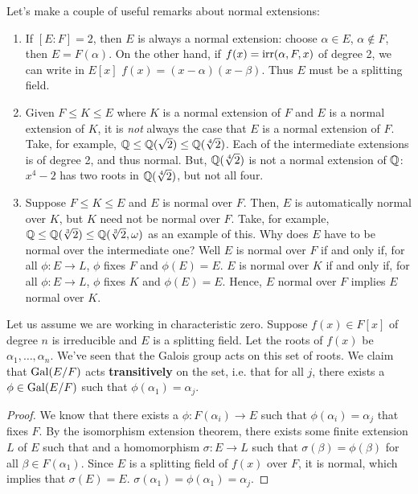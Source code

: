 \documentclass{../mathnotes}
\begin{document}
Let's make a couple of useful remarks about normal extensions:
\begin{enumerate}
    \item If $[E:F]=2$, then $E$ is always a normal extension: choose $\alpha\in E$, $\alpha\notin F$, then $E=F(\alpha)$.
        On the other hand, if $f(x)=\operatorname{irr}(\alpha,F,x)$ of degree 2, we can write in $E[x]$ $f(x)=(x-\alpha)(x-\beta)$.
        Thus $E$ must be a splitting field.
    \item Given $F\leq K\leq E$ where $K$ is a normal extension of $F$ and $E$ is a normal extension of $K$,
        it is \textit{not} always the case that $E$ is a normal extension of $F$. Take, for example,
        $\mathbb{Q}\leq\mathbb{Q}(\sqrt{2})\leq\mathbb{Q}(\sqrt[4]{2})$. Each of the intermediate extensions is of degree 2, and thus normal.
        But, $\mathbb{Q}(\sqrt[4]{2})$ is not a normal extension of $\mathbb{Q}$: $x^4-2$ has two roots in $\mathbb{Q}(\sqrt[4]{2})$, but not all four.
    \item Suppose $F\leq K\leq E$ and $E$ is normal over $F$. Then, $E$ is automatically normal over $K$, but $K$ need not be
        normal over $F$. Take, for example, $\mathbb{Q}\leq\mathbb{Q}(\sqrt[3]{2})\leq\mathbb{Q}(\sqrt[3]{2},\omega)$ as an example of this.
        Why does $E$ have to be normal over the intermediate one? Well $E$ is normal over $F$ if and only if, for all $\phi:E\to L$,
        $\phi$ fixes $F$ and $\phi(E)=E$. $E$ is normal over $K$ if and only if, for all $\phi:E \to L$, $\phi$ fixes $K$ and
        $\phi(E)=E$. Hence, $E$ normal over $F$ implies $E$ normal over $K$.
\end{enumerate}

\begin{rem}
    Let us assume we are working in characteristic zero.
    Suppose $f(x)\in F[x]$ of degree $n$ is irreducible and $E$ is a splitting field. Let the roots of $f(x)$ be $\alpha_1,\ldots,\alpha_n$.
    We've seen that the Galois group acts on this set of roots. We claim that $\operatorname{Gal}(E/F)$ acts \textbf{transitively} on the set, i.e. that for
    all $j$, there exists a $\phi\in\operatorname{Gal}(E/F)$ such that $\phi(\alpha_1)=\alpha_j$.
\end{rem}
\begin{proof}
    We know that there exists a $\phi:F(\alpha_i)\to E$ such that $\phi(\alpha_i)=\alpha_j$ that fixes $F$.
    By the isomorphism extension theorem, there exists some finite extension $L$ of $E$ such that and a homomorphism
    $\sigma:E\to L$ such that $\sigma(\beta)=\phi(\beta)$ for all $\beta\in F(\alpha_1)$. Since $E$ is a splitting field
    of $f(x)$ over $F$, it is normal, which implies that $\sigma(E)=E$. $\sigma(\alpha_1)=\phi(\alpha_1)=\alpha_j$.
\end{proof}
\end{document}
